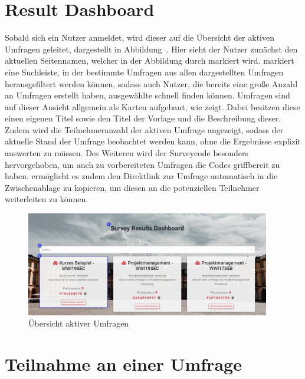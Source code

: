 \section{Result Dashboard}
\label{ssec:ResultDashboard}

Sobald sich ein Nutzer anmeldet, wird dieser auf die Übersicht der aktiven Umfragen geleitet, dargestellt in Abbildung~.
Hier sieht der Nutzer zunächst den aktuellen Seitennamen, welcher in der Abbildung durch \desOne markiert wird.
\desTwo markiert eine Suchleiste, in der bestimmte Umfragen aus allen dargestellten Umfragen herausgefiltert werden können, sodass auch Nutzer, die bereits eine große Anzahl an Umfragen erstellt haben, ausgewählte schnell finden können.
Umfragen sind auf dieser Ansicht allgemein als Karten aufgebaut, wie \desThree zeigt.
Dabei besitzen diese einen eigenen Titel sowie den Titel der Vorlage und die Beschreibung dieser.
Zudem wird die Teilnehmeranzahl der aktiven Umfrage angezeigt, sodass der aktuelle Stand der Umfrage beobachtet werden kann, ohne die Ergebnisse explizit auswerten zu müssen.
Des Weiteren wird der Surveycode besonders hervorgehoben, um auch zu vorbereiteten Umfragen die Codes griffbereit zu haben.
\faClipboard\xspace ermöglicht es zudem den Direktlink zur Umfrage automatisch in die Zwischenablage zu kopieren, um diesen an die potenziellen Teilnehmer weiterleiten zu können.

\begin{figure}[H]
	\centering
	\includegraphics[width=0.95\textwidth, keepaspectratio]{img/guide/ResultDashboard.png}
	\captionsetup{justification=centering, format=plain}
	\caption[Übersicht aktiver Umfragen]{Übersicht aktiver Umfragen \\\quelleScreenshot}
	\label{fig:ResultDashboard}
\end{figure}


\section{Teilnahme an einer Umfrage}
\label{ssec:TeilnahmeAnEinerUmfrage}

